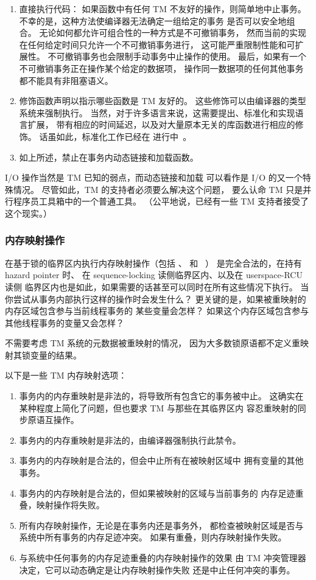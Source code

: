 \begin{enumerate}
\item	直接执行代码：
	如果函数中有任何 TM 不友好的操作，则简单地中止事务。
	不幸的是，这种方法使编译器无法确定一组给定的事务
	是否可以安全地组合。
	无论如何都允许可组合性的一种方式是不可撤销事务，
	然而当前的实现在任何给定时间只允许一个不可撤销事务进行，
	这可能严重限制性能和可扩展性。
	不可撤销事务也会限制手动事务中止操作的使用。
	最后，如果有一个不可撤销事务正在操作某个给定的数据项，
	操作同一数据项的任何其他事务都不能具有非阻塞语义。
\item	修饰函数声明以指示哪些函数是 TM 友好的。
	这些修饰可以由编译器的类型系统来强制执行。
	当然，对于许多语言来说，这需要提出、标准化和实现语言扩展，
	带有相应的时间延迟，以及对大量原本无关的库函数进行相应的修饰。
	话虽如此，标准化工作已经在
	进行中~\cite{Ali-Reza-Adl-Tabatabai2009CppTM,Ali-Reza-Adl-Tabatabai2012CppTM}。
\item	如上所述，禁止在事务内动态链接和加载函数。
\end{enumerate}

I/O 操作当然是 TM 已知的弱点，而动态链接和加载
可以看作是 I/O 的又一个特殊情况。
尽管如此，TM 的支持者必须要么解决这个问题，
要么认命 TM 只是并行程序员工具箱中的一个普通工具。
（公平地说，已经有一些 TM 支持者接受了这个现实。）

\subsubsection{内存映射操作}
\label{sec:future:Memory-Mapping Operations}

在基于锁的临界区内执行内存映射操作（包括 、
 和 ~\cite{TheOpenGroup1997SUS}）
是完全合法的，在持有 hazard pointer 时、
在 sequence-locking 读侧临界区内、以及在 userspace-RCU 读侧
临界区内也是如此，如果需要的话甚至可以同时在所有这些情况下执行。
当你尝试从事务内部执行这样的操作时会发生什么？
更关键的是，如果被重映射的内存区域包含参与当前线程事务的
某些变量会怎样？
如果这个内存区域包含参与其他线程事务的变量又会怎样？

不需要考虑 TM 系统的元数据被重映射的情况，
因为大多数锁原语都不定义重映射其锁变量的结果。

以下是一些 TM 内存映射选项：

\begin{enumerate}
\item	事务内的内存重映射是非法的，将导致所有包含它的事务被中止。
	这确实在某种程度上简化了问题，但也要求 TM 与那些在其临界区内
	容忍重映射的同步原语互操作。
\item	事务内的内存重映射是非法的，由编译器强制执行此禁令。
\item	事务内的内存映射是合法的，但会中止所有在被映射区域中
	拥有变量的其他事务。
\item	事务内的内存映射是合法的，但如果被映射的区域与当前事务的
	内存足迹重叠，映射操作将失败。
\item	所有内存映射操作，无论是在事务内还是事务外，
	都检查被映射区域是否与系统中所有事务的内存足迹冲突。
	如果有重叠，则内存映射操作失败。
\item	与系统中任何事务的内存足迹重叠的内存映射操作的效果
	由 TM 冲突管理器决定，它可以动态确定是让内存映射操作失败
	还是中止任何冲突的事务。
\end{enumerate}

